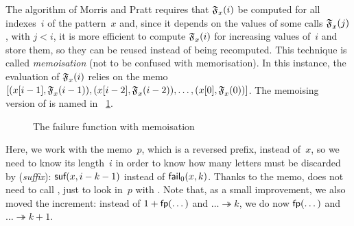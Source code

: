 The algorithm of Morris and Pratt requires that \(\mathfrak{F}_{x}^{}(i)\)
be computed for all indexes~\(i\) of the pattern~\(x\) and, since it
depends on the values of some calls \(\mathfrak{F}_{x}^{}(j)\), with \(j <
i\), it is more efficient to compute \(\mathfrak{F}_{x}^{}(i)\) for
increasing values of~\(i\) and store them, so they can be reused
instead of being recomputed. This technique is called
\emph{memoisation} (not to be confused with
memorisation). In this instance, the evaluation of
\(\mathfrak{F}_{x}^{}(i)\) relies on the memo
\([({{x}[{i-1}]},{\mathfrak{F}_{x}^{}(i-1)}),
({{x}[{i-2}]},{\mathfrak{F}_{x}^{}(i-2)}), \dots,
({{x}[{0}]},{\mathfrak{F}_{x}^{}(0)})]\). The memoising version of
 is named  in
\fig~\ref{fig:fail}.
\begin{figure}[b]
\centering
\abovedisplayskip=0pt
\belowdisplayskip=0pt
\caption{The failure function with memoisation}
\label{fig:fail}
\end{figure}
Here, we work with the memo~\(p\), which is a reversed prefix, instead
of~\(x\), so we need to know its length~\(i\) in order to know how
many letters must be discarded by 
(\emph{suffix}): \(\textsf{suf}(x,i-k-1)\) instead of
\(\textsf{fail}_0(x,k)\). Thanks to the memo,  does not need to
call , just to look in~\(p\) with . Note that,
as a small improvement, we also moved the increment: instead of \(1 +
\textsf{fp}(\dots)\) and \(\dots \twoheadrightarrow k\), we do now
\(\textsf{fp}(\dots)\) and \(\dots \twoheadrightarrow k+1\).


